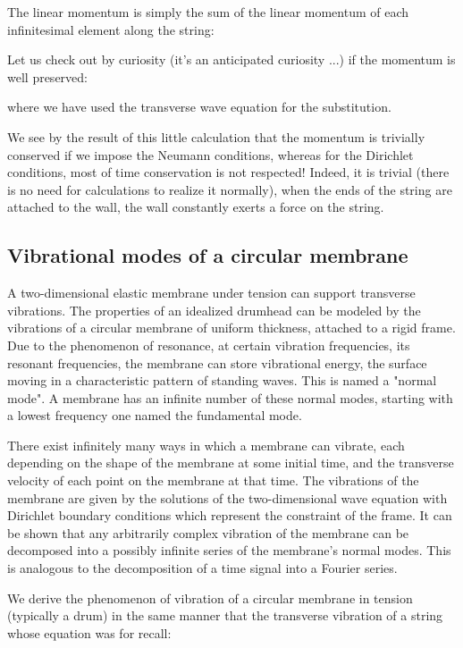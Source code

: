 \begin{enumerate}
		The linear momentum is simply the sum of the linear momentum of each infinitesimal element along the string:
		
		Let us check out by curiosity (it's an anticipated curiosity ...) if the momentum is well preserved:
		
		where we have used the transverse wave equation for the substitution.
		
		We see by the result of this little calculation that the momentum is trivially  conserved if we impose the Neumann conditions, whereas for the Dirichlet conditions, most of time conservation is not respected! Indeed, it is trivial (there is no need for calculations to realize it normally), when the ends of the string are attached to the wall, the wall constantly exerts a force on the string.
	\end{enumerate}
	
	\subsection{Vibrational modes of a circular membrane}
	A two-dimensional elastic membrane under tension can support transverse vibrations. The properties of an idealized drumhead can be modeled by the vibrations of a circular membrane of uniform thickness, attached to a rigid frame. Due to the phenomenon of resonance, at certain vibration frequencies, its resonant frequencies, the membrane can store vibrational energy, the surface moving in a characteristic pattern of standing waves. This is named a "normal mode". A membrane has an infinite number of these normal modes, starting with a lowest frequency one named the fundamental mode.
	
	There exist infinitely many ways in which a membrane can vibrate, each depending on the shape of the membrane at some initial time, and the transverse velocity of each point on the membrane at that time. The vibrations of the membrane are given by the solutions of the two-dimensional wave equation with Dirichlet boundary conditions which represent the constraint of the frame. It can be shown that any arbitrarily complex vibration of the membrane can be decomposed into a possibly infinite series of the membrane's normal modes. This is analogous to the decomposition of a time signal into a Fourier series.
	
	We derive the phenomenon of vibration of a circular membrane in tension (typically a drum) in the same manner that the transverse vibration of a string whose equation was for recall:
		
